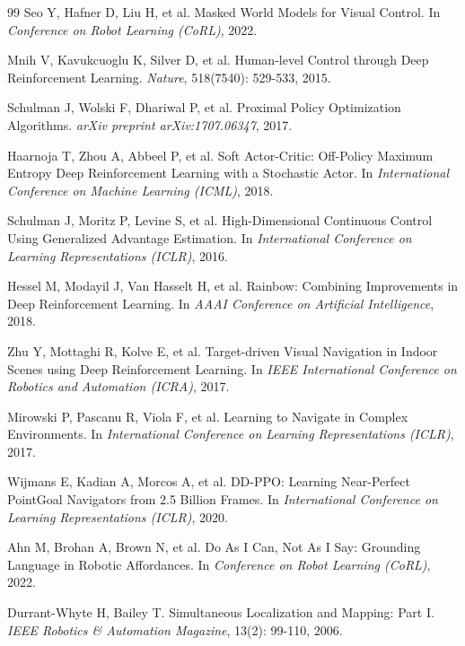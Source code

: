 \documentclass[12pt,a4paper]{ctexart}
\begin{document}
\begin{thebibliography}{99}
Seo Y, Hafner D, Liu H, et al.
\newblock Masked World Models for Visual Control.
\newblock In \textit{Conference on Robot Learning (CoRL)}, 2022.

Mnih V, Kavukcuoglu K, Silver D, et al.
\newblock Human-level Control through Deep Reinforcement Learning.
\newblock \textit{Nature}, 518(7540): 529-533, 2015.

Schulman J, Wolski F, Dhariwal P, et al.
\newblock Proximal Policy Optimization Algorithms.
\newblock \textit{arXiv preprint arXiv:1707.06347}, 2017.

Haarnoja T, Zhou A, Abbeel P, et al.
\newblock Soft Actor-Critic: Off-Policy Maximum Entropy Deep Reinforcement Learning with a Stochastic Actor.
\newblock In \textit{International Conference on Machine Learning (ICML)}, 2018.

Schulman J, Moritz P, Levine S, et al.
\newblock High-Dimensional Continuous Control Using Generalized Advantage Estimation.
\newblock In \textit{International Conference on Learning Representations (ICLR)}, 2016.

Hessel M, Modayil J, Van Hasselt H, et al.
\newblock Rainbow: Combining Improvements in Deep Reinforcement Learning.
\newblock In \textit{AAAI Conference on Artificial Intelligence}, 2018.

Zhu Y, Mottaghi R, Kolve E, et al.
\newblock Target-driven Visual Navigation in Indoor Scenes using Deep Reinforcement Learning.
\newblock In \textit{IEEE International Conference on Robotics and Automation (ICRA)}, 2017.

Mirowski P, Pascanu R, Viola F, et al.
\newblock Learning to Navigate in Complex Environments.
\newblock In \textit{International Conference on Learning Representations (ICLR)}, 2017.

Wijmans E, Kadian A, Morcos A, et al.
\newblock DD-PPO: Learning Near-Perfect PointGoal Navigators from 2.5 Billion Frames.
\newblock In \textit{International Conference on Learning Representations (ICLR)}, 2020.

Ahn M, Brohan A, Brown N, et al.
\newblock Do As I Can, Not As I Say: Grounding Language in Robotic Affordances.
\newblock In \textit{Conference on Robot Learning (CoRL)}, 2022.

Durrant-Whyte H, Bailey T.
\newblock Simultaneous Localization and Mapping: Part I.
\newblock \textit{IEEE Robotics \& Automation Magazine}, 13(2): 99-110, 2006.


\end{thebibliography}
\end{document}
